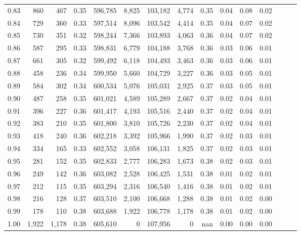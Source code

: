 \begin{tabular}{rrrrrrrrrrrrrrr}
0.83 &     860 &    467 &  0.35 &  596,785 &    8,825 &  103,182 &    4,774 &  0.35 &  0.04 &  0.08 &      0.02 \\
0.84 &     729 &    360 &  0.33 &  597,514 &    8,096 &  103,542 &    4,414 &  0.35 &  0.04 &  0.07 &      0.02 \\
0.85 &     730 &    351 &  0.32 &  598,244 &    7,366 &  103,893 &    4,063 &  0.36 &  0.04 &  0.07 &      0.02 \\
0.86 &     587 &    295 &  0.33 &  598,831 &    6,779 &  104,188 &    3,768 &  0.36 &  0.03 &  0.06 &      0.01 \\
0.87 &     661 &    305 &  0.32 &  599,492 &    6,118 &  104,493 &    3,463 &  0.36 &  0.03 &  0.06 &      0.01 \\
0.88 &     458 &    236 &  0.34 &  599,950 &    5,660 &  104,729 &    3,227 &  0.36 &  0.03 &  0.05 &      0.01 \\
0.89 &     584 &    302 &  0.34 &  600,534 &    5,076 &  105,031 &    2,925 &  0.37 &  0.03 &  0.05 &      0.01 \\
0.90 &     487 &    258 &  0.35 &  601,021 &    4,589 &  105,289 &    2,667 &  0.37 &  0.02 &  0.04 &      0.01 \\
0.91 &     396 &    227 &  0.36 &  601,417 &    4,193 &  105,516 &    2,440 &  0.37 &  0.02 &  0.04 &      0.01 \\
0.92 &     383 &    210 &  0.35 &  601,800 &    3,810 &  105,726 &    2,230 &  0.37 &  0.02 &  0.04 &      0.01 \\
0.93 &     418 &    240 &  0.36 &  602,218 &    3,392 &  105,966 &    1,990 &  0.37 &  0.02 &  0.03 &      0.01 \\
0.94 &     334 &    165 &  0.33 &  602,552 &    3,058 &  106,131 &    1,825 &  0.37 &  0.02 &  0.03 &      0.01 \\
0.95 &     281 &    152 &  0.35 &  602,833 &    2,777 &  106,283 &    1,673 &  0.38 &  0.02 &  0.03 &      0.01 \\
0.96 &     249 &    142 &  0.36 &  603,082 &    2,528 &  106,425 &    1,531 &  0.38 &  0.01 &  0.02 &      0.01 \\
0.97 &     212 &    115 &  0.35 &  603,294 &    2,316 &  106,540 &    1,416 &  0.38 &  0.01 &  0.02 &      0.01 \\
0.98 &     216 &    128 &  0.37 &  603,510 &    2,100 &  106,668 &    1,288 &  0.38 &  0.01 &  0.02 &      0.00 \\
0.99 &     178 &    110 &  0.38 &  603,688 &    1,922 &  106,778 &    1,178 &  0.38 &  0.01 &  0.02 &      0.00 \\
1.00 &   1,922 &  1,178 &  0.38 &  605,610 &        0 &  107,956 &        0 &   nan &  0.00 &  0.00 &      0.00 \\
\bottomrule
\end{tabular}

